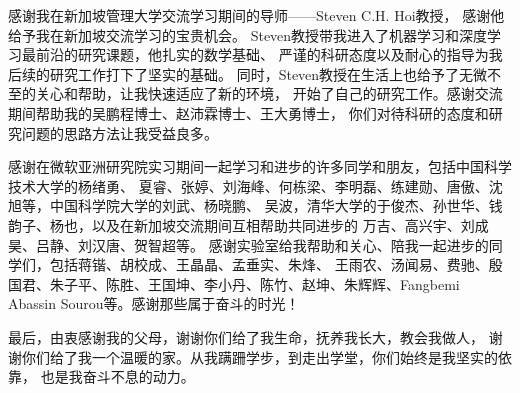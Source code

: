\documentclass[doctor]{ustcthesis}
\begin{document}
\begin{acknowledgements}
    感谢我在新加坡管理大学交流学习期间的导师——Steven C.H. Hoi教授，
    感谢他给予我在新加坡交流学习的宝贵机会。
    Steven教授带我进入了机器学习和深度学习最前沿的研究课题，他扎实的数学基础、
    严谨的科研态度以及耐心的指导为我后续的研究工作打下了坚实的基础。
    同时，Steven教授在生活上也给予了无微不至的关心和帮助，让我快速适应了新的环境，
    开始了自己的研究工作。感谢交流期间帮助我的吴鹏程博士、赵沛霖博士、王大勇博士，
    你们对待科研的态度和研究问题的思路方法让我受益良多。

    感谢在微软亚洲研究院实习期间一起学习和进步的许多同学和朋友，包括中国科学技术大学的杨绪勇、
    夏睿、张婷、刘海峰、何栋梁、李明磊、练建勋、唐傲、沈旭等，中国科学院大学的刘武、杨晓鹏、
    吴波，清华大学的于俊杰、孙世华、钱韵子、杨也，以及在新加坡交流期间互相帮助共同进步的
    万吉、高兴宇、刘成昊、吕静、刘汉唐、贺智超等。
    感谢实验室给我帮助和关心、陪我一起进步的同学们，包括蒋锴、胡校成、王晶晶、孟垂实、朱烽、
    王雨农、汤闻易、费驰、殷国君、朱子平、陈胜、王国坤、李小丹、陈竹、赵坤、朱辉辉、Fangbemi
    Abassin Sourou等。感谢那些属于奋斗的时光！

    最后，由衷感谢我的父母，谢谢你们给了我生命，抚养我长大，教会我做人，
    谢谢你们给了我一个温暖的家。从我蹒跚学步，到走出学堂，你们始终是我坚实的依靠，
    也是我奋斗不息的动力。

\end{acknowledgements}
\end{document}
